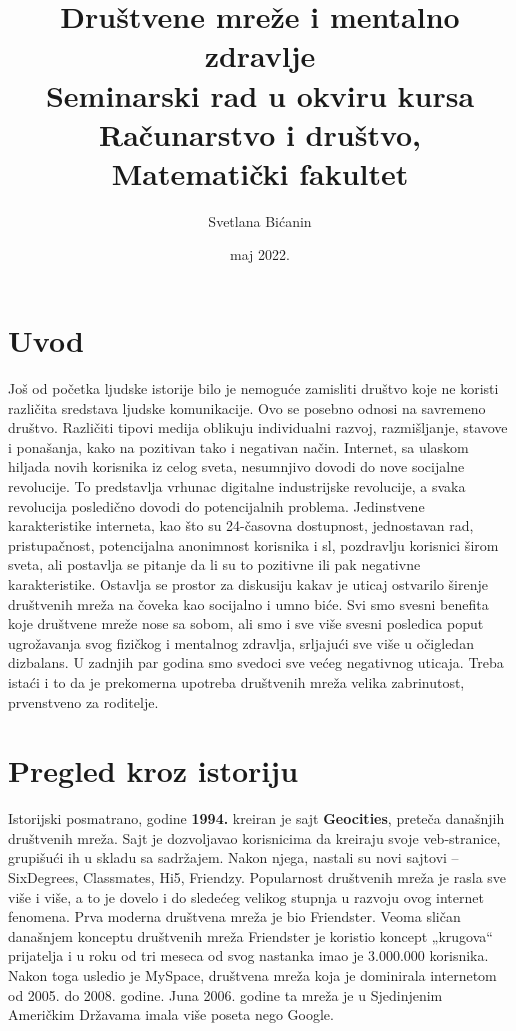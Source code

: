 \documentclass[a4paper]{article}
\begin{document}
	
	\title{Društvene mreže i mentalno zdravlje\\ \small{Seminarski rad u okviru kursa\\Računarstvo i društvo,\\ Matematički fakultet}}
	
	\author{Svetlana Bićanin}
	\date{maj 2022.}
	\maketitle
	
	{
		 		
		\tableofcontents
		
		\newpage
		
		\section{Uvod}
		\label{sec:uvod}
		Još od početka ljudske istorije bilo je nemoguće zamisliti društvo koje ne koristi različita sredstava ljudske komunikacije. Ovo se posebno odnosi na savremeno društvo. Različiti tipovi medija oblikuju individualni razvoj, razmišljanje, stavove i ponašanja, kako na pozitivan tako i negativan način.
		Internet, sa ulaskom hiljada novih korisnika iz celog sveta, nesumnjivo dovodi do nove socijalne revolucije. To predstavlja vrhunac digitalne industrijske revolucije, a svaka revolucija posledično dovodi do potencijalnih problema.
		Jedinstvene karakteristike interneta, kao što su 24-časovna dostupnost, jednostavan rad, pristupačnost, potencijalna anonimnost korisnika i sl, pozdravlju korisnici širom sveta, ali postavlja se pitanje da li su to pozitivne ili pak negativne karakteristike. Ostavlja se prostor za diskusiju kakav je uticaj ostvarilo širenje društvenih mreža na čoveka kao socijalno i umno biće. Svi smo svesni benefita koje društvene mreže nose sa sobom, ali smo i sve više svesni posledica poput ugrožavanja svog fizičkog i mentalnog zdravlja, srljajući sve više u očigledan dizbalans. U zadnjih par godina smo svedoci sve većeg negativnog uticaja. Treba istaći i to da je prekomerna upotreba društvenih mreža velika zabrinutost, prvenstveno za roditelje.
		
		\section{Pregled kroz istoriju}
		Istorijski posmatrano, godine  \textbf{1994.} kreiran je sajt \textbf{Geocities}, preteča današnjih društvenih mreža. Sajt je dozvoljavao korisnicima da kreiraju svoje veb-stranice, grupišući ih u skladu sa sadržajem. Nakon njega, nastali su novi sajtovi – SixDegrees, Classmates, Hi5, Friendzy. Popularnost društvenih mreža je rasla sve više i više, a to je dovelo i do sledećeg velikog stupnja u razvoju ovog internet fenomena. Prva moderna društvena mreža je bio Friendster. Veoma sličan današnjem konceptu društvenih mreža Friendster je koristio koncept „krugova“ prijatelja i u roku
		od tri meseca od svog nastanka imao je 3.000.000 korisnika. Nakon toga usledio je MySpace, društvena mreža koja je dominirala internetom od 2005. do 2008. godine. Juna 2006. godine ta mreža je u Sjedinjenim Američkim Državama imala više poseta nego Google.
}
\end{document}
